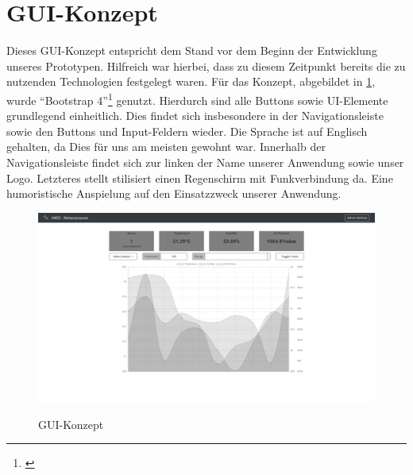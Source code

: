 

\section{GUI-Konzept}\label{gui-konzept}

Dieses GUI-Konzept entspricht dem Stand vor dem Beginn der Entwicklung unseres Prototypen.
Hilfreich war hierbei, dass zu diesem Zeitpunkt bereits die zu nutzenden Technologien festgelegt waren.
Für das Konzept, abgebildet in \cref{fig:gui-konzept}, wurde \enquote{Bootstrap 4}\footnote{\cite{bootstrap}} genutzt.
Hierdurch sind alle Buttons sowie UI-Elemente grundlegend einheitlich.
Dies findet sich insbesondere in der Navigationsleiste sowie den Buttons und Input-Feldern wieder.
Die Sprache ist auf Englisch gehalten, da Dies für uns am meisten gewohnt war.
Innerhalb der Navigationsleiste findet sich zur linken der Name unserer Anwendung sowie unser Logo.
Letzteres stellt stilisiert einen Regenschirm mit Funkverbindung da.
Eine humoristische Anspielung auf den Einsatzzweck unserer Anwendung.

\begin{figure}[h!!]
    \centering
    \begin{minipage}[t]{1\textwidth}
        \caption{GUI-Konzept}
        \includegraphics[width=1\textwidth]{img/gui-konzept.png}\\
        \label{fig:gui-konzept}
    \end{minipage}
\end{figure}

